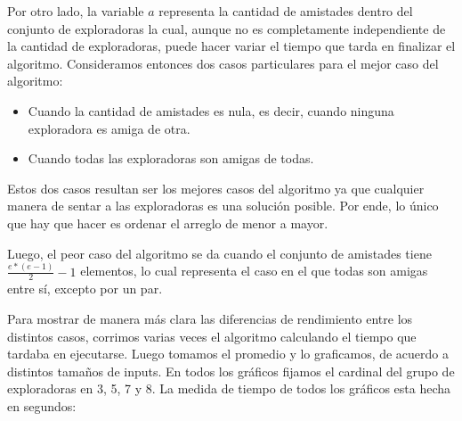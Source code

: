 \documentclass[spanish,a4paper]{article}
\begin{document}
Por otro lado, la variable $a$ representa la cantidad de amistades dentro del conjunto de exploradoras la cual, 
aunque no es completamente independiente de la cantidad de exploradoras, puede hacer variar el tiempo que tarda 
en finalizar el algoritmo. Consideramos entonces dos casos particulares para el mejor caso del algoritmo:
\begin{itemize}
  \item Cuando la cantidad de amistades es nula, es decir, cuando ninguna exploradora es amiga de otra.
  \item Cuando todas las exploradoras son amigas de todas.
\end{itemize}
Estos dos casos resultan ser los mejores casos del algoritmo ya que cualquier manera de sentar a las exploradoras 
es una solución posible. Por ende, lo único que hay que hacer es ordenar el arreglo de menor a mayor. 

Luego, el peor caso del algoritmo se da cuando el conjunto de amistades tiene $\frac{e*(e-1)}{2} - 1$ elementos, 
lo cual representa el caso en el que todas son amigas entre sí, excepto por un par.

Para mostrar de manera más clara las diferencias de rendimiento entre los distintos casos, corrimos varias veces 
el algoritmo calculando el tiempo que tardaba en ejecutarse. Luego tomamos el promedio y lo graficamos, de acuerdo a distintos tamaños de inputs.
En todos los gráficos fijamos el cardinal del grupo de exploradoras en 3, 5, 7 y 8. La medida de tiempo de todos los gráficos esta hecha 
en segundos: 
\end{document}
